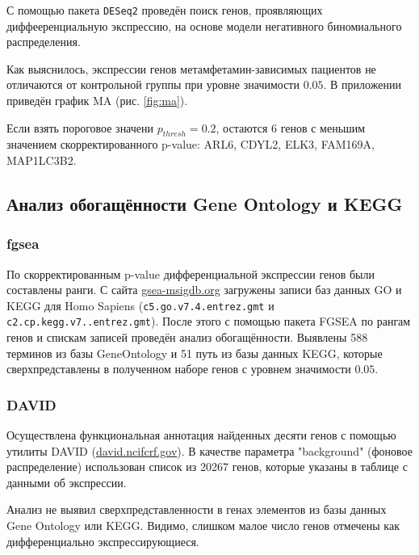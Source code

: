 \documentclass[a4paper,12pt]{article}
\begin{document}
С помощью пакета \texttt{DESeq2} проведён поиск генов, проявляющих диффееренциальную экспрессию, на основе модели негативного биномиального распределения.

Как выяснилось, экспрессии генов метамфетамин-зависимых пациентов не отличаются от контрольной группы при уровне значимости $ 0.05 $.
В приложении приведён график MA (рис. \ref{fig:ma}).

Если взять пороговое значени $ p_{thresh} = 0.2 $, остаются 6 генов с меньшим значением скорректированного p-value:
ARL6, \hspace{0pt}
CDYL2, \hspace{0pt}
ELK3, \hspace{0pt}
FAM169A, \hspace{0pt}
MAP1LC3B2.

\subsection{Анализ обогащённости Gene Ontology и KEGG}

\subsubsection{fgsea}

По скорректированным p-value дифференциальной экспрессии генов были составлены ранги.
С сайта \href{http://www.gsea-msigdb.org/gsea/downloads.jsp}{gsea-msigdb.org} загружены записи баз данных GO и KEGG для Homo Sapiens (\texttt{c5.go.v7.4.entrez.gmt} и \texttt{c2.cp.kegg.\-v7..\-entrez.gmt}).
После этого с помощью пакета FGSEA по рангам генов и спискам записей проведён анализ обогащённости.
Выявлены 588 терминов из базы GeneOntology и 51 путь из базы данных KEGG, которые сверхпредставлены в полученном наборе генов с уровнем значимости $0.05$.

\subsubsection{DAVID}

Осуществлена функциональная аннотация найденных десяти генов с помощью утилиты DAVID (\href{https://david.ncifcrf.gov}{david.ncifcrf.gov}).
В качестве параметра "background" \hspace{0pt} (фоновое распределение) использован список из 20267 генов, которые указаны в таблице с данными об экспрессии.

Анализ не выявил сверхпредставленности в генах элементов из базы данных Gene Ontology или KEGG.
Видимо, слишком малое число генов отмечены как дифференциально экспрессирующиеся.
\end{document}
